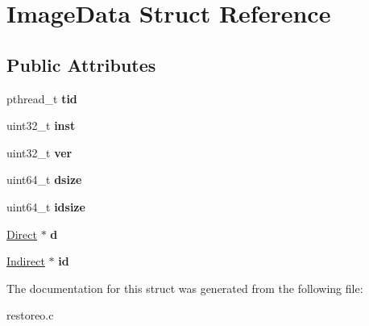 \hypertarget{structImageData}{\section{\-Image\-Data \-Struct \-Reference}
\label{structImageData}
}
\subsection*{\-Public \-Attributes}
\begin{DoxyCompactItemize}
\item 
\hypertarget{structImageData_a6899927be17a584c9fb5234da115e367}{pthread\-\_\-t {\bfseries tid}}\label{structImageData_a6899927be17a584c9fb5234da115e367}

\item 
\hypertarget{structImageData_a2bb70bcfa6989f84311b4e8f1bca7e8a}{uint32\-\_\-t {\bfseries inst}}\label{structImageData_a2bb70bcfa6989f84311b4e8f1bca7e8a}

\item 
\hypertarget{structImageData_a50a0850ebe54e8d4433a84292c862664}{uint32\-\_\-t {\bfseries ver}}\label{structImageData_a50a0850ebe54e8d4433a84292c862664}

\item 
\hypertarget{structImageData_a688562f59199c60c4862baef754c468f}{uint64\-\_\-t {\bfseries dsize}}\label{structImageData_a688562f59199c60c4862baef754c468f}

\item 
\hypertarget{structImageData_a7a8f5466bd8e9c4189326ffdeb99d004}{uint64\-\_\-t {\bfseries idsize}}\label{structImageData_a7a8f5466bd8e9c4189326ffdeb99d004}

\item 
\hypertarget{structImageData_a28f6d8b997af5b28a2e71a22e97b74a7}{\hyperlink{structDirect}{\-Direct} $\ast$ {\bfseries d}}\label{structImageData_a28f6d8b997af5b28a2e71a22e97b74a7}

\item 
\hypertarget{structImageData_abd70b6e80f788ec2f6622d26d0592a1d}{\hyperlink{structIndirect}{\-Indirect} $\ast$ {\bfseries id}}\label{structImageData_abd70b6e80f788ec2f6622d26d0592a1d}

\end{DoxyCompactItemize}


\-The documentation for this struct was generated from the following file\-:\begin{DoxyCompactItemize}
\item 
restoreo.\-c\end{DoxyCompactItemize}
